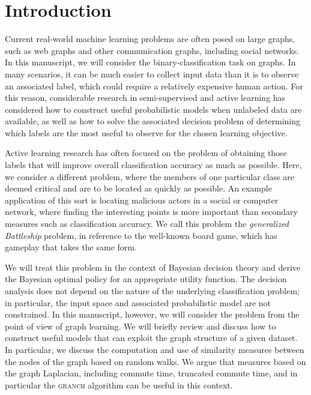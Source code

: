 \documentclass{acm_proc_article-sp}
\begin{document}

\section{Introduction}

Current real-world machine learning problems are often posed on large
graphs, such as web graphs and other communication graphs, including
social networks.  In this manuscript, we will consider the
binary-classification task on graphs.  In many scenarios, it can be
much easier to collect input data than it is to observe an associated
label, which could require a relatively expensive human action.  For
this reason, considerable research in semi-supervised and active
learning has considered how to construct useful probabilistic models
when unlabeled data are available, as well as how to solve the
associated decision problem of determining which labels are the most
useful to observe for the chosen learning objective.

Active learning research has often focused on the problem of obtaining
those labels that will improve overall classification accuracy as much
as possible.  Here, we consider a different problem, where the members
of one particular class are deemed critical and are to be located as
quickly as possible.  An example application of this sort is locating
malicious actors in a social or computer network, where finding the
interesting points is more important than secondary measures such as
classification accuracy.  We call this problem the \emph{generalized
  Battleship} problem, in reference to the well-known board game,
which has gameplay that takes the same form.

We will treat this problem in the context of Bayesian decision theory
and derive the Bayesian optimal policy for an appropriate utility
function.  The decision analysis does not depend on the nature of the
underlying classification problem; in particular, the input space and
associated probabilistic model are not constrained.  In this
manuscript, however, we will consider the problem from the point of
view of graph learning.  We will briefly review and discuss how to
construct useful models that can exploit the graph structure of a
given dataset.  In particular, we discuss the computation and use of
similarity measures between the nodes of the graph based on random
walks.  We argue that measures based on the graph Laplacian, including
commute time, truncated commute time, and in particular the
\textsc{granch} algorithm can be useful in this context.
\end{document}

